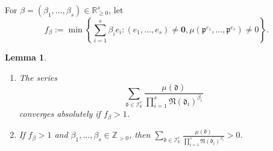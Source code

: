 \documentclass[10pt, a4paper, reqno, english]{amsart}
\newcommand\ZZ{\mathbb{Z}}
\newcommand\RR{\mathbb{R}}
\newcommand{\KK}{\mathbb{K}} %
\newcommand{\idealnorm}{\mathfrak{N}}
\newtheorem{lemma}[theorem]{Lemma}
\theoremstyle{definition}
\numberwithin{theorem}{section}
\numberwithin{equation}{section}
\begin{document}
For $\beta=(\beta_1,\dots,\beta_s)\in\RR_{\geq 0}^s$, let 
$$
f_{\beta}:=\min \left \{\sum_{i=1}^s \beta_i e_i: (e_1,\dots,e_s)\neq\mathbf 0, \mu(\mathfrak p^{e_1},\dots,\mathfrak p^{e_s})\neq0\right \}.
$$

\begin{lemma}\label{lem:mobius}
\begin{enumerate}[label=(\roman*), ref=(\roman*)]
\item
\label{item:mobius convergence}
The series 
$$
\sum_{\mathfrak d\in \mathcal I_{\KK}^s}\frac{\mu(\mathfrak d)}{\prod_{i=1}^s\idealnorm(\mathfrak d_i)^{\beta_i}}
$$
converges absolutely if $f_\beta>1$.
\item 
\label{item:mobius positive}
If $f_\beta>1$ and $\beta_1,\dots,\beta_s\in\ZZ_{>0}$, then $\sum_{\mathfrak d\in \mathcal I_{\KK}^s}\frac{\mu(\mathfrak d)}{\prod_{i=1}^s\idealnorm(\mathfrak d_i)^{\beta_i}}>0$.
\end{enumerate}
\end{lemma}
\end{document}
